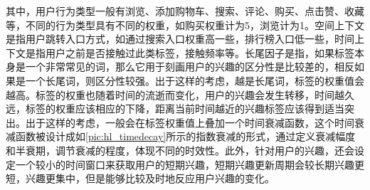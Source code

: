     其中，用户行为类型一般有浏览、添加购物车、搜索、评论、购买、点击赞、收藏等，不同的行为类型具有不同的权重，如购买权重计为5，浏览计为1。空间上下文是指用户跳转入口方式，如通过搜索入口权重高一些，排行榜入口低一些，时间上下文是指用户之前是否接触过此类标签，接触频率等。长尾因子是指，如果标签本身是一个非常常见的词，那么它用于刻画用户的兴趣的区分性是比较差的，相反如果是一个长尾词，则区分性较强。出于这样的考虑，越是长尾词，标签的权重值会越高。标签的权重也随着时间的流逝而变化，用户的兴趣会发生转移，时间越久远，标签的权重应该相应的下降，距离当前时间越近的兴趣标签应该得到适当突出。出于这样的考虑，一般会在标签权重值上叠加一个时间衰减函数，这个时间衰减函数被设计成如\autoref{pic:hl_timedecay}所示的指数衰减的形式，通过定义衰减幅度和半衰期，调节衰减的程度，体现不同的时效性。此外，针对用户的兴趣，还会设定一个较小的时间窗口来获取用户的短期兴趣，短期兴趣更新周期会较长期兴趣更短，兴趣更集中，但是能够比较及时地反应用户兴趣的变化。
    \begin{figure}
    \centering
      \label{pic:hl_timedecay}
    \end{figure}

